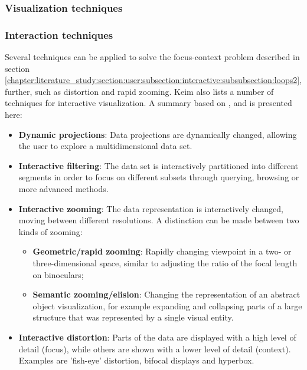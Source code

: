 \subsubsection{Visualization techniques}\label{chapter:literature_study:section:interaction:subsection:techniques:subsubsection:infovis}



\subsubsection{Interaction techniques}\label{chapter:literature_study:section:interaction:subsection:techniques:subsubsection:interaction}

Several techniques can be applied to solve the focus-context problem described in section \ref{chapter:literature_study:section:user:subsection:interactive:subsubsection:loops2}, further, such as distortion and rapid zooming\cite{ware:2004}. Keim \cite{keim:2002} also lists a number of techniques for interactive visualization. A summary based on \cite{ware:2004}, \cite{shirley:2009} and \cite{keim:2002} is presented here:

\begin{itemize}
	\item \textbf{Dynamic projections}: Data projections are dynamically changed, allowing the user to explore a multidimensional data set.
	\item \textbf{Interactive filtering}: The data set is interactively partitioned into different segments in order to focus on different subsets through querying, browsing or more advanced methods.
	\item \textbf{Interactive zooming}: The data representation is interactively changed, moving between different resolutions. A distinction can be made between two kinds of zooming\cite{shirley:2009, ware:2004}:
	\begin{itemize}
		\item \textbf{Geometric/rapid zooming}: Rapidly changing viewpoint in a two- or three-dimensional space, similar to adjusting the ratio of the focal length on binoculars;
		\item \textbf{Semantic zooming/elision}: Changing the representation of an abstract object visualization, for example expanding and collapsing parts of a large structure that was represented by a single visual entity.
	\end{itemize}
	\item \textbf{Interactive distortion}: Parts of the data are displayed with a high level of detail (focus), while others are shown with a lower level of detail (context). Examples are 'fish-eye' distortion, bifocal displays and hyperbox.
\end{itemize}


